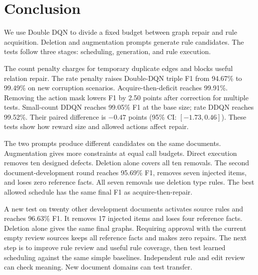 \section{Conclusion}

We use Double DQN to divide a fixed budget between graph repair and rule
acquisition. Deletion and augmentation prompts generate rule candidates.
The tests follow three stages: scheduling, generation, and rule execution.

The count penalty charges for temporary duplicate edges and blocks useful
relation repair. The rate penalty raises Double-DQN triple F1 from 94.67\%
to 99.49\% on new corruption scenarios. Acquire-then-deficit reaches 99.91\%.
Removing the action mask lowers F1 by 2.50 points after correction for
multiple tests. Small-count DDQN reaches 99.05\% F1 at the base size; rate DDQN reaches
99.52\%. Their paired difference is $-0.47$ points
(95\% CI: $[-1.73,0.46]$). These tests show how reward size
and allowed actions affect repair.

The two prompts produce different candidates on the same documents.
Augmentation gives more constraints at equal call budgets.
Direct execution removes ten designed defects. Deletion alone covers all
ten removals. The second document-development round reaches 95.69\% F1,
removes seven injected items, and loses zero reference facts. All seven
removals use deletion type rules. The best allowed schedule has the same
final F1 as acquire-then-repair.

A new test on twenty other development documents activates source rules
and reaches 96.63\% F1. It removes 17 injected items and loses four reference
facts. Deletion alone gives the same final graphs. Requiring approval
with the current empty review sources keeps all reference facts and makes
zero repairs. The next step is to improve rule review and useful rule
coverage, then test learned scheduling against the same simple baselines.
Independent rule and edit review can check meaning. New document domains
can test transfer.
